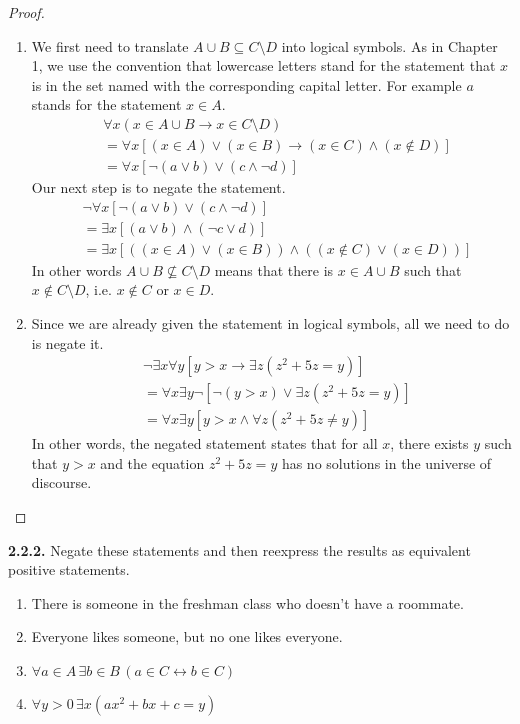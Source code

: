 \documentclass[12pt]{amsart}
\newenvironment{statement}[1]{\smallskip\noindent\color[rgb]{.6627, .3529, .6314} {\bf #1.}}{}
\theoremstyle{definition}
\theoremstyle{remark}
\begin{document}
\begin{proof}
\begin{enumerate}
	\item We first need to translate $A \cup B \subseteq C \setminus D$ into logical symbols.
	As in Chapter 1, we use the convention that lowercase letters stand for the statement that $x$ is in the set named with the corresponding capital letter.
	For example $a$ stands for the statement $x \in A$.
	\begin{align*}
		& \forall x (x \in A \cup B \rightarrow x \in C \setminus D) \\
		&= \forall x [(x \in A) \vee (x \in B) \rightarrow (x \in C) \wedge (x \notin D)] \\
		&= \forall x [\neg (a \vee b) \vee (c \wedge \neg d)]
	\end{align*}
	Our next step is to negate the statement.
	\begin{align*}
		& \neg \forall x [\neg (a \vee b) \vee (c \wedge \neg d)] \\
		&= \exists x [(a \vee b) \wedge (\neg c \vee d)] \\
		&= \exists x [((x \in A) \vee (x \in B)) \wedge ((x \notin C) \vee (x \in D))]
	\end{align*}
	In other words $A \cup B \nsubseteq C \setminus D$ means that there is $x \in A \cup B$
	such that $x \notin C \setminus D$, i.e. $x \notin C$ or $x \in D$.
	
	\item Since we are already given the statement in logical symbols, all we need to do is negate it.
	\begin{align*}
		& \neg \exists x \forall y [y > x \rightarrow \exists z (z^2 + 5z = y)] \\
		&= \forall x \exists y \neg [\neg(y > x) \vee \exists z (z^2 + 5z = y)] \\
		&= \forall x \exists y [y > x \wedge \forall z (z^2 + 5z \neq y)]
	\end{align*}
	In other words, the negated statement states that for all $x$, there exists $y$ such that
	$y > x$ and the equation $z^2 + 5z = y$ has no solutions in the universe of discourse.
\end{enumerate}
\end{proof}


\begin{statement}{2.2.2}
Negate these statements and then reexpress the results as equivalent positive statements.
\begin{enumerate}
	\item There is someone in the freshman class who doesn't have a roommate.
	
	\item Everyone likes someone, but no one likes everyone.
	
	\item $\forall a \in A \, \exists b \in B \, (a \in C \leftrightarrow b \in C)$
	
	\item $\forall y > 0 \, \exists x (ax^2 + bx + c = y)$
\end{enumerate}
\end{statement}
\end{document}
